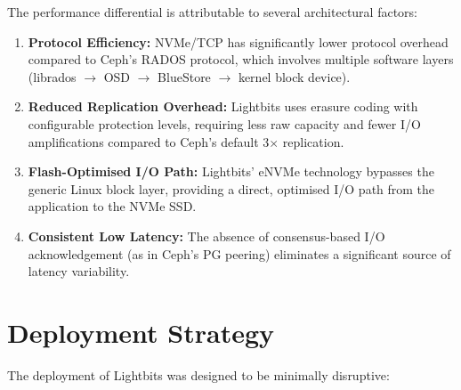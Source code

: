 \documentclass[12pt,a4paper,oneside]{report}
\begin{document}
The performance differential is attributable to several architectural factors:

\begin{enumerate}
    \item \textbf{Protocol Efficiency:} NVMe/TCP has significantly lower protocol overhead compared to Ceph's RADOS protocol, which involves multiple software layers (librados $\to$ OSD $\to$ BlueStore $\to$ kernel block device).
    \item \textbf{Reduced Replication Overhead:} Lightbits uses erasure coding with configurable protection levels, requiring less raw capacity and fewer I/O amplifications compared to Ceph's default 3$\times$ replication.
    \item \textbf{Flash-Optimised I/O Path:} Lightbits' eNVMe technology bypasses the generic Linux block layer, providing a direct, optimised I/O path from the application to the NVMe SSD.
    \item \textbf{Consistent Low Latency:} The absence of consensus-based I/O acknowledgement (as in Ceph's PG peering) eliminates a significant source of latency variability.
\end{enumerate}

\section{Deployment Strategy}

The deployment of Lightbits was designed to be minimally disruptive:
\end{document}
